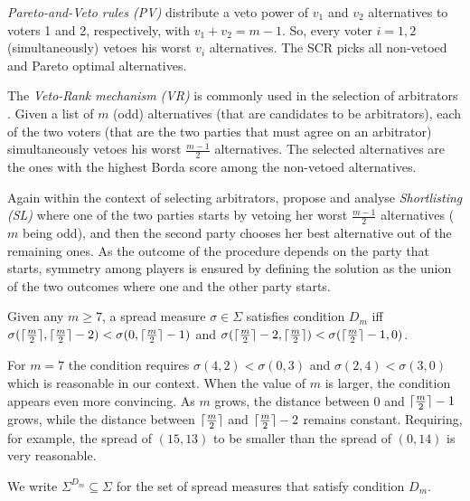 \emph{Pareto-and-Veto rules (PV)} \citep{Moulin1983, Abreu1991, Laslier2020} distribute a veto power of $v_1$ and $v_2$ alternatives to voters 1 and 2, respectively, with $v_1+v_2=m-1$. So, every voter $i=1,2$ (simultaneously) vetoes his worst $v_i$ alternatives. The \ac{SCR} picks all non-vetoed and Pareto optimal alternatives.

The \emph{Veto-Rank mechanism (VR)} is commonly used in the selection of arbitrators \citep{Clippel2014}. Given a list of $m$ (odd) alternatives (that are candidates to be arbitrators), each of the two voters (that are the two parties that must agree on an arbitrator) simultaneously vetoes his worst $\frac{m-1}{2}$ alternatives. The selected alternatives are the ones with the highest Borda score among the non-vetoed alternatives.

Again within the context of selecting arbitrators, \citet{Clippel2014} propose and analyse \emph{Shortlisting (SL)} where one of the two parties starts by vetoing her worst $\frac{m-1}{2}$ alternatives ($m$ being odd), and then the second party chooses her best alternative out of the remaining ones. As the outcome of the procedure depends on the party that starts, symmetry among players is ensured by defining the solution as the union of the two outcomes where one and the other party starts.


\begin{definition}
	Given any $m \geq 7$, a spread measure $\sigma \in \Sigma$ satisfies condition $D_m$ iff 
	$\sigma(\lceil\frac{m}{2}\rceil, \lceil\frac{m}{2}\rceil - 2) < \sigma(0, \lceil\frac{m}{2}\rceil - 1)$ and 
	$\sigma(\lceil\frac{m}{2}\rceil - 2, \lceil\frac{m}{2}\rceil) < \sigma(\lceil\frac{m}{2}\rceil - 1, 0)$.
\end{definition}

For $m=7$ the condition requires $\sigma(4, 2) < \sigma(0, 3)$ and $\sigma(2, 4) < \sigma(3, 0)$ which is reasonable in our context. When the value of $m$ is larger, the condition appears even more convincing. As $m$ grows, the distance between $0$ and $\lceil\frac{m}{2}\rceil - 1$ grows, while the distance between $\lceil\frac{m}{2}\rceil$ and $\lceil\frac{m}{2}\rceil - 2$ remains constant. Requiring, for example, the spread of $(15, 13)$ to be smaller than the spread of $(0, 14)$ is very reasonable.

We write $\Sigma^{D_{m}} \subseteq \Sigma$ for the set of spread measures that satisfy condition $D_{m}$. 

